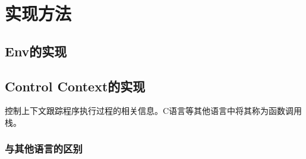 \chapter{实现方法}

\section{Env的实现}

\section{Control Context的实现}

控制上下文跟踪程序执行过程的相关信息。C语言等其他语言中将其称为函数调用栈。

\subsection{与其他语言的区别}